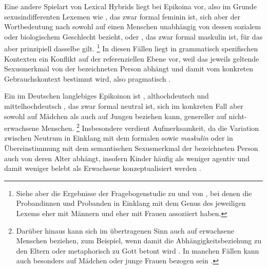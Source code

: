 \label{phsec:epikoina}

Eine andere Spielart von Lexical Hybrids liegt bei Epikoina vor, also im Grunde
sexus\-indifferenten Lexemen wie , das zwar formal feminin ist, sich
aber der Wortbedeutung nach sowohl auf einen Menschen unabhängig von dessen
sozialem oder biologischem Geschlecht bezieht, oder
, das zwar formal maskulin ist, für das aber prinzipiell dasselbe
gilt.%
%
	\footnote{Siehe aber die Ergebnisse der Fragebogenstudie zu
		 und  von \citet[174--183]{klein2022}, bei denen
		die Probandinnen und Probanden in Einklang mit dem Genus des jeweiligen
		Lexems  eher mit Männern und  eher mit Frauen
		assoziiert haben.}
%
In diesen Fällen liegt in grammatisch spezifischen Kontexten ein Konflikt auf
der referenziellen Ebene vor, weil das jeweils geltende Sexusmerkmal von der
bezeichneten Person abhängt und damit vom konkreten Gebrauchskontext bestimmt
wird, also pragmatisch \autocite[142--144]{klein2022}.

Ein im Deutschen langlebiges Epikoinon ist ,
althochdeutsch  und
mittelhochdeutsch , das zwar formal neutral
ist, sich im konkreten Fall aber sowohl auf Mädchen als auch auf Jungen
beziehen kann, genereller auf nicht-erwachsene Menschen.%
%
	\footnote{Darüber hinaus kann sich  im übertragenen Sinn auch auf
		erwachsene Menschen beziehen, zum Beispiel, wenn damit die
		Abhängigkeitsbeziehung zu den Eltern oder metaphorisch zu Gott betont
		wird \autocite[s.\,v.~\textit{kint}]{lexer:mhdhwb}. In manchen Fällen
		kann  auch besonders auf Mädchen oder junge Frauen bezogen
		sein \autocites[808--816]{drw7}[s.\,v.~\textit{Kind}]{duden-online}.}
%
Insbesondere  verdient Aufmerksamkeit, da die Variation zwischen
Neutrum in Einklang mit dem formalen  sowie \emph{maskulin}
oder  in Übereinstimmung mit dem semantischen Sexusmerkmal der
bezeichneten Person auch von deren Alter abhängt, insofern Kinder häufig als
weniger agentiv und damit weniger belebt als Erwachsene konzeptualisiert werden
\autocites[196]{comrie1989}[258--259]{birkenesfleischer2022}[151]{klein2022}.

